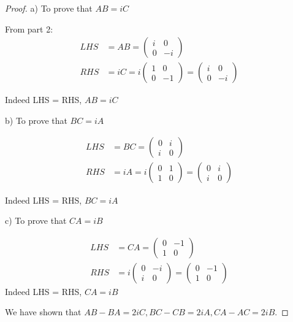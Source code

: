 \documentclass{article}
\begin{document}
\begin{proof}
a) To prove that $AB = iC$

From part 2:
\begin{align}
LHS &= AB = \begin{pmatrix}
i & 0 \\ 0 & -i
\end{pmatrix} \\
RHS &= iC = i \begin{pmatrix}
1 & 0 \\ 0 & -1
\end{pmatrix} = \begin{pmatrix}
i & 0 \\ 0 & -i
\end{pmatrix}
\end{align}

Indeed LHS = RHS, $AB = iC$

b) To prove that $BC = iA$

\begin{align}
LHS &= BC = \begin{pmatrix}
0 & i \\ i & 0
\end{pmatrix} \\
RHS &= iA = i \begin{pmatrix}
0 & 1 \\ 1 & 0
\end{pmatrix} = \begin{pmatrix}
0 & i \\ i & 0
\end{pmatrix}
\end{align}

Indeed LHS = RHS, $BC = iA$

c) To prove that $CA = iB$

\begin{align}
LHS &= CA = \begin{pmatrix}
0 & -1 \\ 1 & 0
\end{pmatrix} \\
RHS &= i \begin{pmatrix}
0 & -i \\ i & 0
\end{pmatrix} = \begin{pmatrix}
0 & -1 \\ 1 & 0
\end{pmatrix}
\end{align}
Indeed LHS = RHS, $CA = iB$

We have shown that $AB - BA = 2iC, BC - CB = 2iA, CA - AC = 2iB$.
\end{proof}
\end{document}
